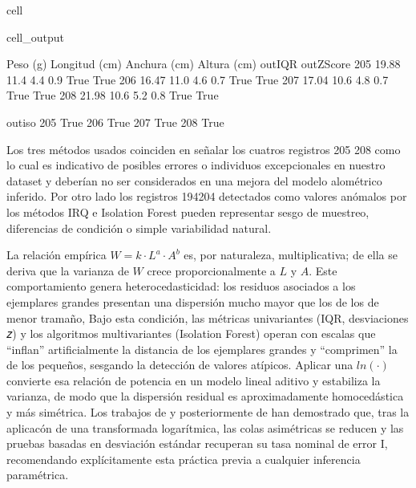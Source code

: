 \documentclass[a4paper,10pt,spanish]{jupyterBook}
\begin{document}
\begin{sphinxuseclass}{cell}
\begin{sphinxVerbatimOutput}
\begin{sphinxuseclass}{cell_output}
\begin{sphinxVerbatim}[commandchars=\\\{\}]
     Peso (g)  Longitud (cm)  Anchura (cm)  Altura (cm)  out\PYGZus{}IQR  out\PYGZus{}ZScore  \PYGZbs{}
205     19.88           11.4           4.4          0.9     True        True
206     16.47           11.0           4.6          0.7     True        True
207     17.04           10.6           4.8          0.7     True        True
208     21.98           10.6           5.2          0.8     True        True

     out\PYGZus{}iso
205     True
206     True
207     True
208     True
\end{sphinxVerbatim}

\end{sphinxuseclass}\end{sphinxVerbatimOutput}

\end{sphinxuseclass}
\sphinxAtStartPar
Los tres métodos usados coinciden en señalar los cuatros registros 205 \sphinxhyphen{} 208 como  lo cual es indicativo de posibles errores o individuos excepcionales en nuestro dataset y deberían no ser considerados en una mejora del modelo alométrico inferido. Por otro lado los registros 194\sphinxhyphen{}204 detectados como valores anómalos por los métodos IRQ e Isolation Forest pueden representar sesgo de muestreo, diferencias de condición o simple variabilidad natural.

\sphinxAtStartPar
La relación empírica \(𝑊=𝑘 \cdot L^a \cdot A^b\) es, por naturaleza, multiplicativa; de ella se deriva que la varianza de \(𝑊\) crece proporcionalmente a \(𝐿\) y \(A\). Este comportamiento genera heterocedasticidad: los residuos asociados a los ejemplares grandes presentan una dispersión mucho mayor que los de los de menor tramaño, Bajo esta condición, las métricas univariantes (IQR, desviaciones 𝑧) y los algoritmos multivariantes (Isolation Forest) operan con escalas que “inflan” artificialmente la distancia de los ejemplares grandes y “comprimen” la de los pequeños, sesgando la detección de valores atípicos. Aplicar una  \(ln(⋅)\)
convierte esa relación de potencia en un modelo lineal aditivo y estabiliza la varianza, de modo que la dispersión residual es aproximadamente homocedástica y más simétrica. Los trabajos de  y posteriormente de   han demostrado que, tras la aplicacón de una transformada logarítmica, las colas asimétricas se reducen y las pruebas basadas en desviación estándar recuperan su tasa nominal de error I, recomendando explícitamente esta práctica previa a cualquier inferencia paramétrica.
\end{document}
